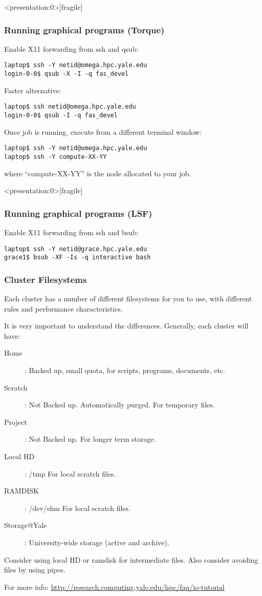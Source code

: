 \documentclass[10pt]{beamer}
\begin{document}
\begin{frame}<presentation:0>[fragile]
\frametitle{Running graphical programs (Torque)}
Enable X11 forwarding from ssh and qsub:
\begin{verbatim}
laptop$ ssh -Y netid@omega.hpc.yale.edu
login-0-0$ qsub -X -I -q fas_devel
\end{verbatim}

Faster alternative:
\begin{verbatim}
laptop$ ssh netid@omega.hpc.yale.edu
login-0-0$ qsub -I -q fas_devel
\end{verbatim}

Once job is running, execute from a different terminal window:
\begin{verbatim}
laptop$ ssh -Y netid@omega.hpc.yale.edu
laptop$ ssh -Y compute-XX-YY
\end{verbatim}

where ``compute-XX-YY'' is the node allocated to your job.
\end{frame}

\begin{frame}<presentation:0>[fragile]
\frametitle{Running graphical programs (LSF)}
Enable X11 forwarding from ssh and bsub:
\begin{verbatim}
laptop$ ssh -Y netid@grace.hpc.yale.edu
grace1$ bsub -XF -Is -q interactive bash
\end{verbatim}
\end{frame}

\begin{frame}[fragile]
\frametitle{Cluster Filesystems}
Each cluster has a number of different filesystems for you to use, with different
rules and performance characteristics.  

\vskip10pt

It is very important to understand the differences.  Generally, each cluster will have:

\begin{description}
\item[Home]: Backed up, small quota, for scripts, programs, documents, etc.
\item[Scratch]: Not Backed up.  Automatically purged.  For temporary files.
\item[Project]: Not Backed up.  For longer term storage.
\item[Local HD]: /tmp  For local scratch files.
\item[RAMDISK]: /dev/shm For local scratch files.
\item[Storage@Yale]: University-wide storage (active and archive).
\end{description}

Consider using local HD or ramdisk for intermediate files.  Also consider avoiding files by using pipes.

For more info: \url{http://research.computing.yale.edu/hpc/faq/io-tutorial}

\end{frame}
\end{document}
